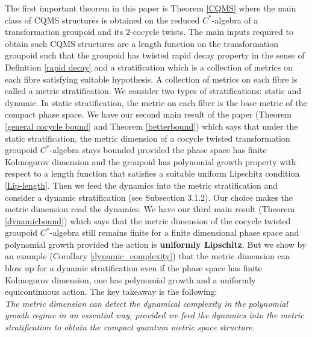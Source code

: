 \documentclass[a4paper,11pt,reqno]{amsart}
\theoremstyle{plain}
\theoremstyle{mainthmstyle}
\theoremstyle{named}
\numberwithin{equation}{section}
\begin{document}
\indent The first important theorem in this paper is Theorem \ref{CQMS} where the main class of CQMS structures is obtained on the reduced $C^{\ast}$-algebra of a transformation groupoid and its $2$-cocycle twists. The main inputs required to obtain such CQMS structures are a length function on the transformation groupoid such that the groupoid has twisted rapid decay property in the sense of Definition \ref{rapid decay} and a stratification which is a collection of metrics on each fibre satisfying suitable hypothesis. A collection of metrics on each fibre is called a metric stratification. We consider two types of stratifications: static and dynamic. In static stratification, the metric on each fiber is the base metric of the compact phase space. We have our second main result of the paper (Theorem \ref{general cocycle bound} and Theorem \ref{betterbound}) which says that under the static stratification, the metric dimension of a cocycle twisted transformation groupoid $C^{\ast}$-algebra stays bounded provided the phase space has finite Kolmogorov dimension and the groupoid has polynomial growth property with respect to a length function that satisfies a suitable uniform Lipschitz condition \ref{Lip-length}. Then we feed the dynamics into the metric stratification and consider a dynamic stratification (see Subsection 3.1.2). Our choice makes the metric dimension read the dynamics. We have our third main result (Theorem \ref{dynamicbound}) which says that the metric dimension of the cocycle twisted groupoid $C^{\ast}$-algebra still remains finite for a finite dimensional phase space and polynomial growth provided the action is {\bf uniformly Lipschitz}. But we show by an example (Corollary \ref{dynamic_complexity}) that the metric dimension can blow up for a dynamic stratification even if the phase space has finite Kolmogorov dimension, one has polynomial growth and a uniformly equicontinuous action. The key takeaway is the following:\vspace{0.05in}\\
{\it The metric dimension can detect the dynamical complexity in the polynomial growth regime in an essential way, provided we feed the dynamics into the metric stratification to obtain the compact quantum metric space structure}.\vspace{0.05in}\\
\end{document}
